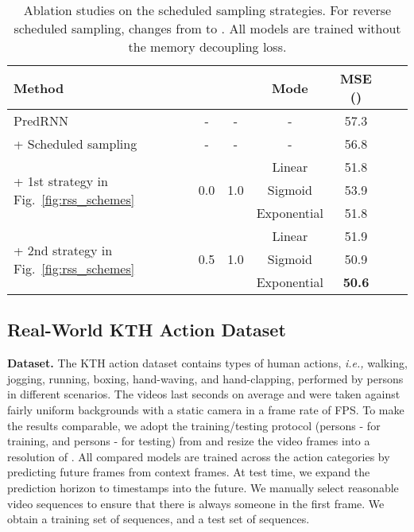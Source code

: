 \documentclass[10pt,journal,compsoc]{IEEEtran}
\let\MYoriglatexcaption\caption
\renewcommand{\caption}[2][\relax]{\MYoriglatexcaption[#2]{#2}}
\newcommand{\fig}[1]{Fig.~\ref{#1}}
\newcommand{\myparagraph}[1]{\vspace{5pt} \noindent \textbf{#1.}}
\begin{document}
\begin{table}[h]
\vspace{5pt}
  \caption{Ablation studies on the scheduled sampling strategies. For reverse scheduled sampling,  changes from  to . All models are trained without the memory decoupling loss.}
  \vskip -0.05in
  \label{tab:mnist_rss}
  \centering
  \renewcommand{\multirowsetup}{\centering}  
  \begin{tabular}{lcccccc}
    \toprule
    Method &  &  & Mode & MSE () \\
    \midrule
    PredRNN & - & - & - & 57.3 \\
    + Scheduled sampling \cite{bengio2015scheduled} & - & - & - & 56.8 \\
    \midrule
    \multirow{3}{*}{+ 1st strategy in \fig{fig:rss_schemes}} & \multirow{3}{*}{0.0} & \multirow{3}{*}{1.0} & Linear & 51.8 \\
     &  &  & Sigmoid & 53.9 \\
     &  &  & Exponential & 51.8 \\
    \midrule
    \multirow{3}{*}{+ 2nd strategy in \fig{fig:rss_schemes}} & \multirow{3}{*}{0.5} & \multirow{3}{*}{1.0} & Linear & 51.9 \\
     &  &  & Sigmoid & 50.9 \\
     &  &  & Exponential & \textbf{50.6} \\
    \bottomrule
  \end{tabular}
\end{table}

\subsection{Real-World KTH Action Dataset}

\myparagraph{Dataset} 
The KTH action dataset \cite{Sch2004Recognizing} contains  types of human actions, \textit{i.e.,} walking, jogging, running, boxing, hand-waving, and hand-clapping, performed by  persons in  different scenarios. The videos last  seconds on average and were taken against fairly uniform backgrounds with a static camera in a frame rate of  FPS. 
To make the results comparable, we adopt the training/testing protocol (persons - for training, and persons - for testing) from \cite{Villegas2017Decomposing} and resize the video frames into a resolution of . 
All compared models are trained across the  action categories by predicting  future frames from  context frames. At test time, we expand the prediction horizon to  timestamps into the future. 
We manually select reasonable video sequences to ensure that there is always someone in the first frame. We obtain a training set of  sequences, and a test set of  sequences.
\end{document}
